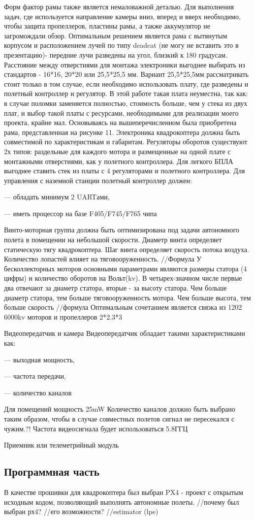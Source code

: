 Форм фактор рамы также является немаловажной деталью. Для выполнения задач, где используется направление камеры вниз, вперед и вверх необходимо, чтобы защита пропеллеров, пластины рамы, а также аккумулятор не загромождали обзор. Оптимальным решением является рама с вытянутым корпусом и расположением лучей по типу deadcat (не могу не вставить это в презентацию)- передние лучи разведены на угол, близкий к 180 градусам. Расстояние между отверстиями для монтажа электроники выгоднее выбирать из стандартов - 16*16, 20*20 или 25,5*25,5 мм. Вариант 25,5*25,5мм рассматривать стоит только в том случае, если необходимо использовать плату, где разведены и полетный контроллер и регулятор. В этой работе такая плата неуместна, так как: в случае поломки заменяется полностью, стоимость больше, чем у стека из двух плат, и выбор такой платы с ресурсами, необходимыми для реализации моего проекта, крайне мал. Основываясь на вышеперечисленном была приобретена рама, представленная на рисунке 11.
Электроника квадрокоптера должна быть совместимой по характеристикам и габаритам. Регуляторы оборотов существуют 2х типов: раздельные для каждого мотора и размещенные на одной плате с монтажными отверстиями, как у полетного контроллера. Для легкого БПЛА выгоднее ставить стек из платы с 4 регуляторами и полетного контроллера.
Для управления с наземной станции полетный контроллер должен:

--- обладать минимум 2 UARTами,

--- иметь процессор на базе F405/F745/F765 чипа

Винто-моторная группа должна быть оптимизирована под задачи автономного полета в помещении на небольшой скорости.
Диаметр винта определяет статическую тягу квадрокоптера.
Шаг винта определяет скорость потока воздуха.
Количество лопастей влияет на тяговооруженность.
//Формула 
У бесколлекторных моторов основными параметрами являются размеры статора (4 цифры) и количество оборотов на Вольт(kv). В четырех-значном числе первые два отвечают за диаметр статора, вторые - за высоту статора. Чем больше диаметр статора, тем больше тяговооруженность мотора. Чем больше высота, тем больше скорость
//формула
Оптимальным сочетанием является связка из 1202 6000kv моторов и пропеллеров 2*2.3*3

Видеопередатчик и камера
Видеопередатчик обладает такими характеристиками как:

--- выходная мощность,

--- частота передачи,

--- количество каналов

Для помещений мощность 25mW
Количество каналов должно быть выбрано таким образом, чтобы в случае совместных полетов сигнал не пересекался с чужим.?!
Частота видеосигнала будет использоваться 5.8ГГЦ

Приемник или телеметрийный модуль


\subsection{Программная часть}
В качестве прошивки для квадрокоптера был выбран PX4 - проект с открытым исходным кодом, позволяющий выполнять автономные полеты.
//почему был выбран рх4?
//его возможности?
//estimator (lpe)

